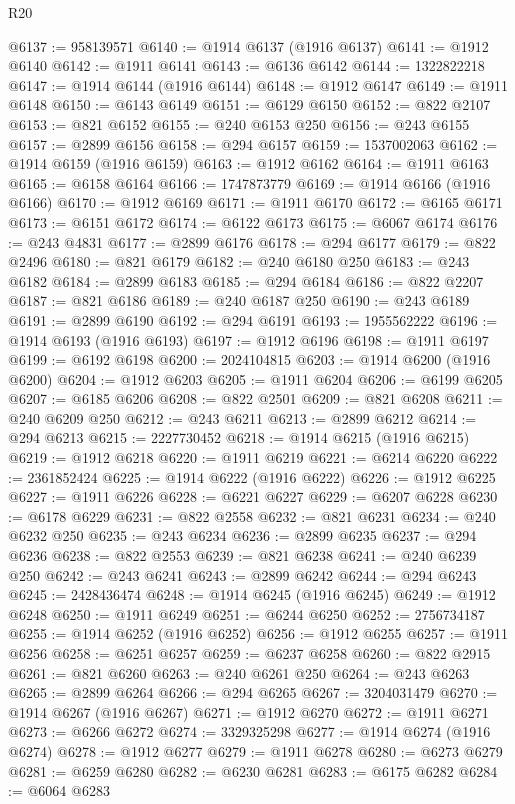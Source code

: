 \begin{lexlean}{R20}
\begin{coremodule}
{@6137 := 958139571
@6140 := @1914 @6137 (@1916 @6137)
@6141 := @1912 @6140
@6142 := @1911 @6141
@6143 := @6136 @6142
@6144 := 1322822218
@6147 := @1914 @6144 (@1916 @6144)
@6148 := @1912 @6147
@6149 := @1911 @6148
@6150 := @6143 @6149
@6151 := @6129 @6150
@6152 := @822 @2107
@6153 := @821 @6152
@6155 := @240 @6153 @250
@6156 := @243 @6155
@6157 := @2899 @6156
@6158 := @294 @6157
@6159 := 1537002063
@6162 := @1914 @6159 (@1916 @6159)
@6163 := @1912 @6162
@6164 := @1911 @6163
@6165 := @6158 @6164
@6166 := 1747873779
@6169 := @1914 @6166 (@1916 @6166)
@6170 := @1912 @6169
@6171 := @1911 @6170
@6172 := @6165 @6171
@6173 := @6151 @6172
@6174 := @6122 @6173
@6175 := @6067 @6174
@6176 := @243 @4831
@6177 := @2899 @6176
@6178 := @294 @6177
@6179 := @822 @2496
@6180 := @821 @6179
@6182 := @240 @6180 @250
@6183 := @243 @6182
@6184 := @2899 @6183
@6185 := @294 @6184
@6186 := @822 @2207
@6187 := @821 @6186
@6189 := @240 @6187 @250
@6190 := @243 @6189
@6191 := @2899 @6190
@6192 := @294 @6191
@6193 := 1955562222
@6196 := @1914 @6193 (@1916 @6193)
@6197 := @1912 @6196
@6198 := @1911 @6197
@6199 := @6192 @6198
@6200 := 2024104815
@6203 := @1914 @6200 (@1916 @6200)
@6204 := @1912 @6203
@6205 := @1911 @6204
@6206 := @6199 @6205
@6207 := @6185 @6206
@6208 := @822 @2501
@6209 := @821 @6208
@6211 := @240 @6209 @250
@6212 := @243 @6211
@6213 := @2899 @6212
@6214 := @294 @6213
@6215 := 2227730452
@6218 := @1914 @6215 (@1916 @6215)
@6219 := @1912 @6218
@6220 := @1911 @6219
@6221 := @6214 @6220
@6222 := 2361852424
@6225 := @1914 @6222 (@1916 @6222)
@6226 := @1912 @6225
@6227 := @1911 @6226
@6228 := @6221 @6227
@6229 := @6207 @6228
@6230 := @6178 @6229
@6231 := @822 @2558
@6232 := @821 @6231
@6234 := @240 @6232 @250
@6235 := @243 @6234
@6236 := @2899 @6235
@6237 := @294 @6236
@6238 := @822 @2553
@6239 := @821 @6238
@6241 := @240 @6239 @250
@6242 := @243 @6241
@6243 := @2899 @6242
@6244 := @294 @6243
@6245 := 2428436474
@6248 := @1914 @6245 (@1916 @6245)
@6249 := @1912 @6248
@6250 := @1911 @6249
@6251 := @6244 @6250
@6252 := 2756734187
@6255 := @1914 @6252 (@1916 @6252)
@6256 := @1912 @6255
@6257 := @1911 @6256
@6258 := @6251 @6257
@6259 := @6237 @6258
@6260 := @822 @2915
@6261 := @821 @6260
@6263 := @240 @6261 @250
@6264 := @243 @6263
@6265 := @2899 @6264
@6266 := @294 @6265
@6267 := 3204031479
@6270 := @1914 @6267 (@1916 @6267)
@6271 := @1912 @6270
@6272 := @1911 @6271
@6273 := @6266 @6272
@6274 := 3329325298
@6277 := @1914 @6274 (@1916 @6274)
@6278 := @1912 @6277
@6279 := @1911 @6278
@6280 := @6273 @6279
@6281 := @6259 @6280
@6282 := @6230 @6281
@6283 := @6175 @6282
@6284 := @6064 @6283
}
\end{coremodule}
\end{lexlean}
